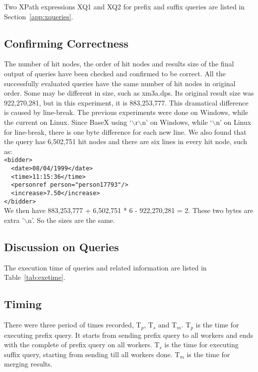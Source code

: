 Two XPath expressions XQ1 and XQ2 for prefix and suffix queries 
are listed in Section~\ref{app:xqueries}.



\subsection{Confirming Correctness}

The number of hit nodes, the order of hit nodes and results size of
the final output of queries have been checked and confirmed to be correct. 
All the successfully evaluated queries 
have the same number of hit nodes in original order. Some may be 
different in size, such as xm3a.dps. Its original result size
was 922,270,281, but in this experiment, it is 883,253,777.
This dramatical difference is caused by line-break. The previous 
experiments were done on Windows, while the current on Linux. 
Since BaseX using `$\backslash$r$\backslash$n' on Windows, while
 `$\backslash$n' on Linux for line-break, there is one byte 
difference for each new line. We also found that the query has 
6,502,751 hit nodes and  there are six lines in every hit node, 
such as:\\
\verb|<bidder>|\\
\verb|  <date>08/04/1999</date>|\\
\verb|  <time>11:15:36</time>|\\
\verb|  <personref person="person17793"/>|\\
\verb|  <increase>7.50</increase>|\\
\verb|</bidder>|\\

We then have 883,253,777 + 6,502,751 * 6 - 922,270,281 = 2. These two bytes are
extra '$\backslash$n'. So the sizes are the same.



\subsection{Discussion on Queries}

The execution time of queries and related information are listed in
Table~\ref{tab:exetime}. 

\subsection{Timing}

There were three period of times recorded, T$_p$, T$_s$ and T$_m$. T$_p$ is the
time for executing prefix query. It starts from sending  prefix query to all
workers and ends with the complete of prefix query on all workers. 
T$_s$ is the time for executing suffix query, starting from sending till all 
workers done. T$_m$ is the time for merging results. 


